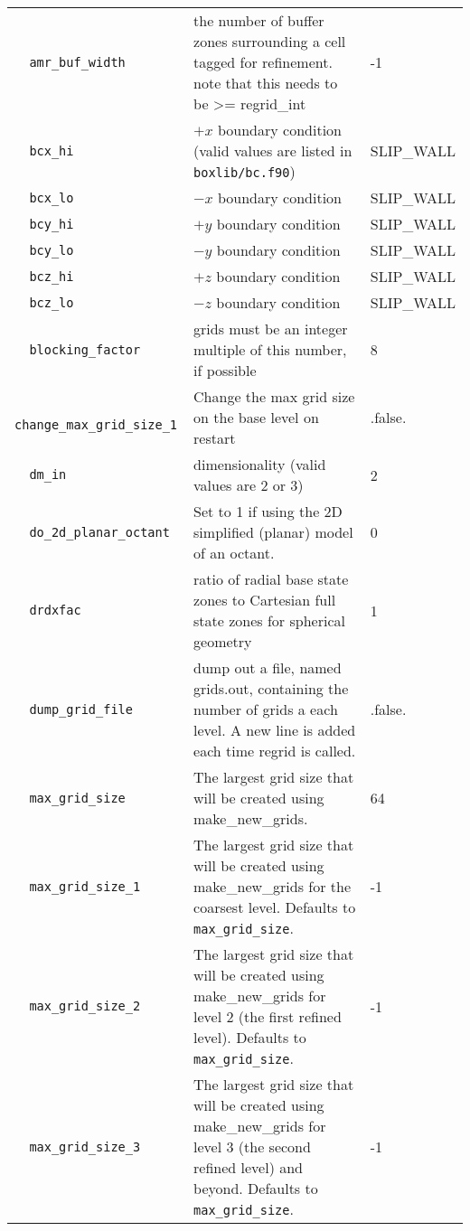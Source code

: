 \begin{landscape}
{\begin{center}
\begin{longtable}{|l|p{5.25in}|l|}
\rowcolor{tableShade}
\verb=  amr_buf_width  = &   the number of buffer zones surrounding a cell tagged for refinement. note that this needs to be >= regrid\_int  &  -1 \\
\verb=  bcx_hi  = &   $+x$ boundary condition (valid values are listed in {\tt  boxlib/bc.f90})  &  SLIP\_WALL \\
\rowcolor{tableShade}
\verb=  bcx_lo  = &   $-x$ boundary condition  &  SLIP\_WALL \\
\verb=  bcy_hi  = &   $+y$ boundary condition  &  SLIP\_WALL \\
\rowcolor{tableShade}
\verb=  bcy_lo  = &   $-y$ boundary condition  &  SLIP\_WALL \\
\verb=  bcz_hi  = &   $+z$ boundary condition  &  SLIP\_WALL \\
\rowcolor{tableShade}
\verb=  bcz_lo  = &   $-z$ boundary condition  &  SLIP\_WALL \\
\verb=  blocking_factor  = &   grids must be an integer multiple of this number, if possible  &  8 \\
\rowcolor{tableShade}
\verb=  change_max_grid_size_1  = &   Change the max grid size on the base level on restart  &  .false. \\
\verb=  dm_in  = &   dimensionality (valid values are 2 or 3)  &  2 \\
\rowcolor{tableShade}
\verb=  do_2d_planar_octant  = &   Set to 1 if using the 2D simplified (planar) model of an octant.  &  0 \\
\verb=  drdxfac  = &   ratio of radial base state zones to Cartesian full state zones for spherical geometry  &  1 \\
\rowcolor{tableShade}
\verb=  dump_grid_file  = &   dump out a file, named grids.out, containing the number of grids a each level. A new line is added each time regrid is called.  &  .false. \\
\verb=  max_grid_size  = &   The largest grid size that will be created using make\_new\_grids.  &  64 \\
\rowcolor{tableShade}
\verb=  max_grid_size_1  = &   The largest grid size that will be created using make\_new\_grids for the coarsest level.  Defaults to {\tt max\_grid\_size}.  &  -1 \\
\verb=  max_grid_size_2  = &   The largest grid size that will be created using make\_new\_grids for level 2 (the first refined level).  Defaults to {\tt max\_grid\_size}.  &  -1 \\
\rowcolor{tableShade}
\verb=  max_grid_size_3  = &   The largest grid size that will be created using make\_new\_grids for level 3 (the second refined level) and beyond.  Defaults to {\tt max\_grid\_size}.  &  -1 \\

\end{longtable}
\end{center}}
\end{landscape}

